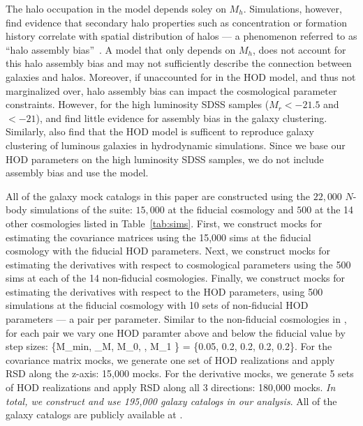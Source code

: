 The halo occupation in the \cite{zheng2007} model depends soley on $M_h$. 
Simulations, however, find evidence that secondary halo properties such as
concentration or formation history correlate with spatial distribution of
halos --- a phenomenon referred to as ``halo assembly bias''~\citep[\eg][]{sheth2004,
gao2005, harker2006, wechsler2006, dalal2008, wang2009a, lacerna2014,
contreras2020, hadzhiyska2020}.
A model that only depends on $M_h$, does not account for this halo assembly 
bias and may not sufficiently describe the connection between galaxies and 
halos. Moreover, if unaccounted for in the HOD model, and thus not marginalized 
over, halo assembly bias can impact the cosmological parameter constraints. 
However, for the high luminosity SDSS samples ($M_r < -21.5$  and $<-21$), 
\cite{zentner2016} and \cite{vakili2019} find little evidence for assembly bias 
in the galaxy clustering. Similarly, \cite{beltz-mohrmann2020} also find that
the \cite{zheng2007} HOD model is sufficent to reproduce galaxy clustering of
luminous galaxies in hydrodynamic simulations. Since we base our HOD parameters
on the high luminosity SDSS samples, we do not include assembly bias and use
the \cite{zheng2007} model. 


All of the galaxy mock catalogs in this paper are constructed using the $22,000$ 
$N$-body simulations of the \quij suite: $15,000$ at the fiducial cosmology and $500$ at the 14 other cosmologies
listed in Table~\ref{tab:sims}. First, we construct mocks for estimating the
covariance matrices using the 15,000 \quij sims at the fiducial cosmology with
the fiducial HOD parameters. Next, we construct mocks for estimating the
derivatives with respect to cosmological parameters using the 500 \quij sims at
each of the 14 non-fiducial cosmologies. Finally, we construct mocks for
estimating the derivatives with respect to the HOD parameters, using 500 \quij
simulations at the fiducial cosmology with 10 sets of non-fiducial HOD
parameters --- a pair per parameter. Similar to the non-fiducial cosmologies in
\quij, for each pair we vary one HOD paramter above and below the fiducial
value by step sizes:
\beq
\{\Delta M_{\rm min}, \Delta \sigma_{\log M}, \Delta \log M_0, \Delta \alpha,
\Delta \log M_1 \} = \{0.05, 0.2, 0.2, 0.2, 0.2\}.
\eeq
For the covariance matrix mocks, we generate one set of HOD realizations and apply 
RSD along the z-axis: 15,000 mocks. For the derivative mocks, we generate 5
sets of HOD realizations and apply RSD along all 3 directions: 180,000 mocks.
{\em In total, we construct and use 195,000 galaxy catalogs in our analysis}.
All of the galaxy catalogs are publicly available at .
